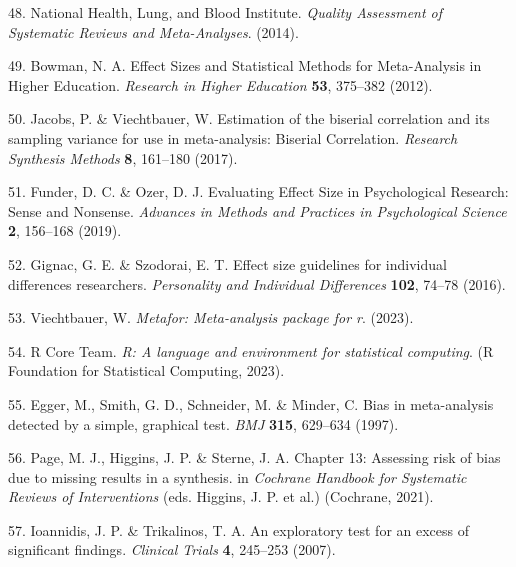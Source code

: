 \documentclass[
  english,
  man]{apa6}
\newenvironment{cslreferences}%
  {}%
  {\par}
\begin{document}
\begin{cslreferences}
\leavevmode\hypertarget{ref-NHLBIQualityAssessmentSystematic2014}{}%
48. National Health, Lung, and Blood Institute. \emph{Quality Assessment of Systematic Reviews and Meta-Analyses}. (2014).

\leavevmode\hypertarget{ref-bowmanEffectSizesStatistical2012}{}%
49. Bowman, N. A. Effect Sizes and Statistical Methods for Meta-Analysis in Higher Education. \emph{Research in Higher Education} \textbf{53}, 375--382 (2012).

\leavevmode\hypertarget{ref-jacobsEstimationBiserialCorrelation2017}{}%
50. Jacobs, P. \& Viechtbauer, W. Estimation of the biserial correlation and its sampling variance for use in meta-analysis: Biserial Correlation. \emph{Research Synthesis Methods} \textbf{8}, 161--180 (2017).

\leavevmode\hypertarget{ref-funderEvaluatingEffectSize2019}{}%
51. Funder, D. C. \& Ozer, D. J. Evaluating Effect Size in Psychological Research: Sense and Nonsense. \emph{Advances in Methods and Practices in Psychological Science} \textbf{2}, 156--168 (2019).

\leavevmode\hypertarget{ref-gignacEffectSizeGuidelines2016}{}%
52. Gignac, G. E. \& Szodorai, E. T. Effect size guidelines for individual differences researchers. \emph{Personality and Individual Differences} \textbf{102}, 74--78 (2016).

\leavevmode\hypertarget{ref-R-metafor}{}%
53. Viechtbauer, W. \emph{Metafor: Meta-analysis package for r}. (2023).

\leavevmode\hypertarget{ref-R-base}{}%
54. R Core Team. \emph{R: A language and environment for statistical computing}. (R Foundation for Statistical Computing, 2023).

\leavevmode\hypertarget{ref-eggerBiasMetaanalysisDetected1997}{}%
55. Egger, M., Smith, G. D., Schneider, M. \& Minder, C. Bias in meta-analysis detected by a simple, graphical test. \emph{BMJ} \textbf{315}, 629--634 (1997).

\leavevmode\hypertarget{ref-pageChapter13Assessing2021}{}%
56. Page, M. J., Higgins, J. P. \& Sterne, J. A. Chapter 13: Assessing risk of bias due to missing results in a synthesis. in \emph{Cochrane Handbook for Systematic Reviews of Interventions} (eds. Higgins, J. P. et al.) (Cochrane, 2021).

\leavevmode\hypertarget{ref-ioannidisExploratoryTestExcess2007}{}%
57. Ioannidis, J. P. \& Trikalinos, T. A. An exploratory test for an excess of significant findings. \emph{Clinical Trials} \textbf{4}, 245--253 (2007).


\end{cslreferences}
\end{document}
